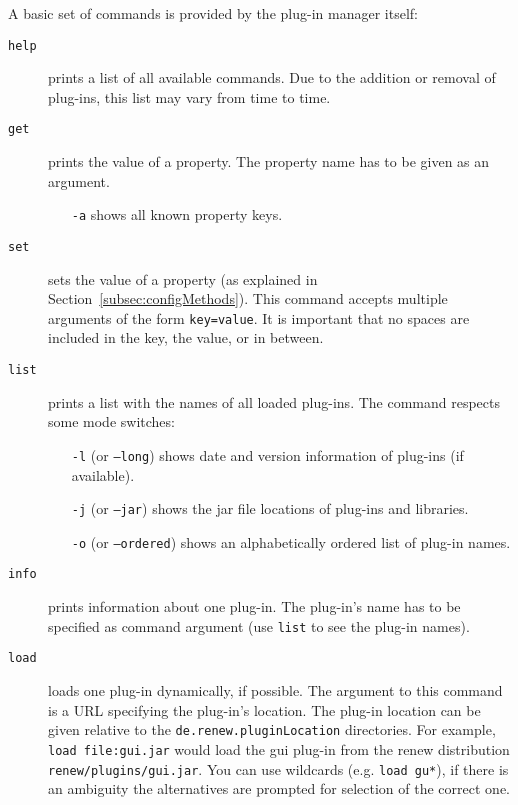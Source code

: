 A basic set of commands is provided by the plug-in manager itself:
\begin{description}
\item[\texttt{help}]
  prints a list of all available commands.
  Due to the addition or removal of plug-ins, this list may vary from
  time to time.
\item[\texttt{get}]
  prints the value of a property. The property name has to be given as
  an argument.
  \begin{itemize}
  \item[\texttt{-a}] shows all known property keys.
  \end{itemize}
\item[\texttt{set}]
  sets the value of a property (as explained in
  Section~\ref{subsec:configMethods}).
  This command accepts multiple arguments of the form
  \texttt{key=value}.
  It is important that no spaces are included in the key, the
  value, or in between.
\item[\texttt{list}]
  prints a list with the names of all loaded plug-ins.
  The command respects some mode switches:
  \begin{itemize}
  \item[\texttt{-l}] (or \texttt{--long}) shows date and version
    information of plug-ins (if available).
  \item[\texttt{-j}] (or \texttt{--jar}) shows the jar file locations of
    plug-ins and libraries.
  \item[\texttt{-o}] (or \texttt{--ordered}) shows an alphabetically ordered list of plug-in names.
  \end{itemize}
\item[\texttt{info}]
  prints information about one plug-in.
  The plug-in's name has to be specified as command argument (use
  \texttt{list} to see the plug-in names).
\item[\texttt{load}]
  loads one plug-in dynamically, if possible.
  The argument to this command is a URL specifying the plug-in's
  location.
  The plug-in location can be given relative to the
  \texttt{de.renew.pluginLocation} directories.
  For example, \texttt{load file:gui.jar} would load the gui
  plug-in from the renew distribution
  \texttt{renew\renewversion/plugins/gui.jar}. You can use wildcards (e.g. \texttt{load gu*}), if there is an ambiguity the alternatives are prompted for selection of the correct one.
  

\end{description}
